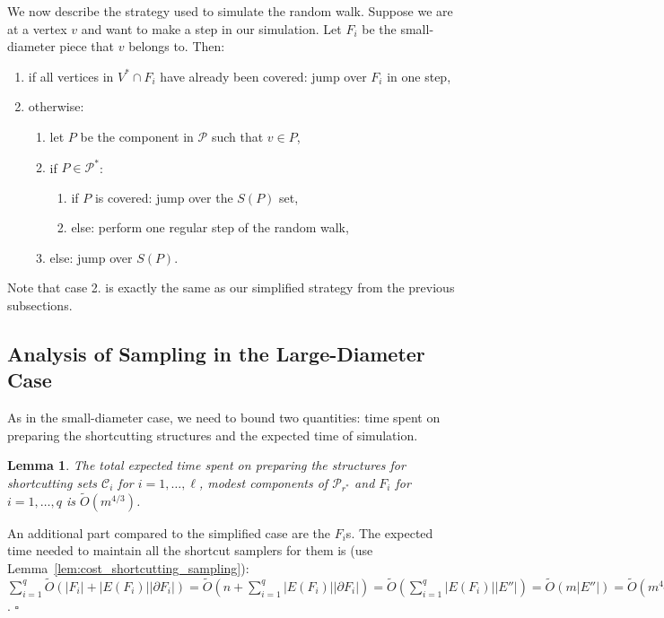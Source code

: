 \documentclass[11pt, letterpaper]{article}
\newtheorem{lemma}[theorem]{Lemma}
\newenvironment{proof}{\noindent{\bf Proof:}\hspace*{1em}}{\qed\bigskip}
\newcommand{\qed}{\hfill\ensuremath{\square}}
\newcommand{\cC}{\mathcal{C}}
\newcommand{\cP}{\mathcal{P}}
\newcommand{\tO}{\widetilde{O}}
\begin{document}
We now describe the strategy used to simulate the random walk. Suppose we are at a vertex $v$ and want to make a step in our simulation. Let $F_i$ be the small-diameter piece that $v$ belongs to. Then:
\begin{enumerate}
	\item if all vertices in $V^*\cap F_i$ have already been covered: jump over $F_i$ in one step,
	\item otherwise:
	\begin{enumerate}
		\item let $P$ be the component in $\cP$ such that $v\in P$,
		\item if $P\in \cP^*$:
		\begin{enumerate}
			\item if $P$ is covered: jump over the $S(P)$ set,
			\item else: perform one regular step of the random walk,
		\end{enumerate}
		\item else: jump over $S(P)$.
	\end{enumerate}
\end{enumerate}
Note that case 2. is exactly the same as our simplified strategy from the previous subsections.


\subsection{Analysis of Sampling in the Large-Diameter Case}
As in the small-diameter case, we need to bound two quantities: time spent on preparing the shortcutting structures and the expected time of simulation.
\begin{lemma}\label{lem:preparation_cost_general}
The total expected time spent on preparing the structures for shortcutting sets $\cC_i$ for $i=1,\dots,\ell$, modest components of $\cP_{r^*}$ and $F_i$ for $i=1,\ldots,q$ is $\tO(m^{4/3})$.
\end{lemma}
\begin{proof}
An additional part compared to the simplified case are the $F_i$s. The expected time needed to maintain all the shortcut samplers for them is (use Lemma~\ref{lem:cost_shortcutting_sampling}): $\sum_{i=1}^{q} \tO(|F_i|+|E(F_i)||\partial F_i|)=\tO(n+\sum_{i=1}^{q}|E(F_i)||\partial F_i|)=\tO(\sum_{i=1}^{q}|E(F_i)||E''|)=\tO(m|E''|)=\tO(m^{4/3})$.
\end{proof}
\end{document}
